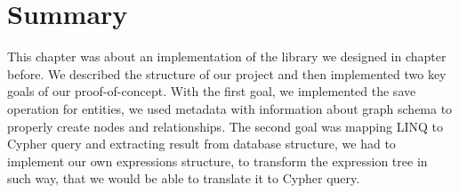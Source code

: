 \section{Summary}

This chapter was about an implementation of the library we designed in chapter before. We described the structure of our project and then implemented
two key goals of our proof-of-concept. With the first goal, we implemented the save operation for entities, we used metadata with information about graph
schema to properly create nodes and relationships. The second goal was mapping LINQ to Cypher query and extracting result from database structure,
we had to implement our own expressions structure, to transform the expression tree in such way, that we would be able to translate it to Cypher query.


